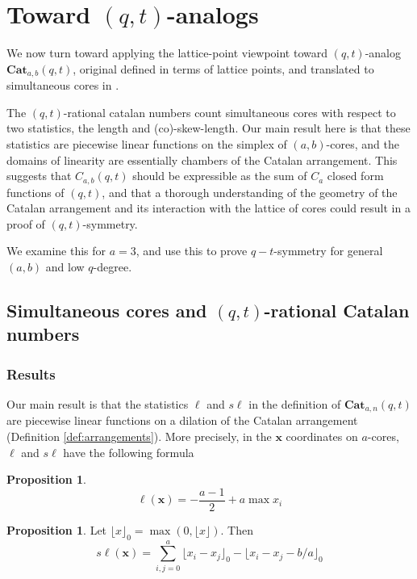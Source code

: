 \documentclass{amsart}[12pt]
\theoremstyle{definition}
\newtheorem{proposition}[dummy]{Proposition}
\newcommand{\Cat}{\mathbf{Cat}}
\newcommand{\sk}{s\ell}
\begin{document}
\section{Toward \texorpdfstring{$(q,t)$}{(q,t)}-analogs} \label{sec:qt}

We now turn toward applying the lattice-point viewpoint toward $(q,t)$-analog $\Cat_{a,b}(q,t)$, original defined in terms of lattice points, and translated to simultaneous cores in \cite{AHJ}.  

The $(q,t)$-rational catalan numbers count simultaneous cores with respect to two statistics, the length and (co)-skew-length.   Our main result here is that these statistics are piecewise linear functions on the simplex of $(a,b)$-cores, and the domains of linearity are essentially chambers of the Catalan arrangement. This suggests that $C_{a,b}(q,t)$ should be expressible as the sum of $C_a$ closed form functions of $(q,t)$, and that a thorough understanding of the geometry of the Catalan arrangement and its interaction with the lattice of cores could result in a proof of $(q,t)$-symmetry.

We examine this for $a=3$, and use this to prove $q-t$-symmetry for general $(a,b)$ and low $q$-degree.

\subsection{Simultaneous cores and \texorpdfstring{$(q,t)$}{(q,t)}-rational Catalan numbers}

\subsubsection{Results}
Our main result is that the statistics $\ell$ and $\sk$ in the definition of $\Cat_{a,n}(q,t)$ are piecewise linear functions on a dilation of the Catalan arrangement (Definition \ref{def:arrangements}).  More precisely, in the $\mathbf{x}$ coordinates on $a$-cores, $\ell$ and $\sk$ have the following formula

\begin{proposition}
\label{prop:length}
$$\ell(\mathbf{x})=-\frac{a-1}{2}+a\max x_i$$
\end{proposition}

\begin{proposition}
\label{prop:skewlength}
Let $\lfloor x\rfloor_0=\max\left(0, \lfloor x\rfloor\right)$.
Then
$$\sk(\mathbf{x})=\sum_{i,j=0}^a \lfloor x_i-x_j\rfloor_0 - \lfloor x_i-x_j-b/a\rfloor_0$$
\end{proposition}
\end{document}
